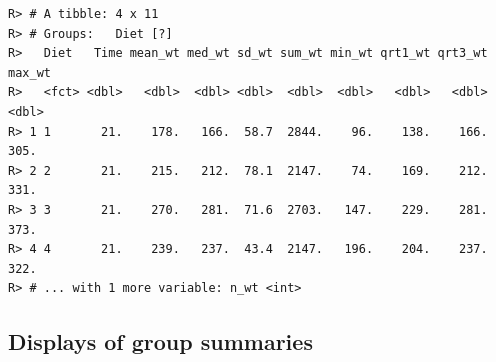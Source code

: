 \documentclass[english,10pt,a4paper,oneside]{book}
\newenvironment{Shaded}{\begin{snugshade}}{\end{snugshade}}
\newcommand{\KeywordTok}[1]{\textcolor[rgb]{0.13,0.29,0.53}{\textbf{#1}}}
\newcommand{\DataTypeTok}[1]{\textcolor[rgb]{0.13,0.29,0.53}{#1}}
\newcommand{\DecValTok}[1]{\textcolor[rgb]{0.00,0.00,0.81}{#1}}
\newcommand{\FloatTok}[1]{\textcolor[rgb]{0.00,0.00,0.81}{#1}}
\newcommand{\StringTok}[1]{\textcolor[rgb]{0.31,0.60,0.02}{#1}}
\newcommand{\OtherTok}[1]{\textcolor[rgb]{0.56,0.35,0.01}{#1}}
\newcommand{\OperatorTok}[1]{\textcolor[rgb]{0.81,0.36,0.00}{\textbf{#1}}}
\newcommand{\NormalTok}[1]{#1}
\theoremstyle{definition}
\theoremstyle{definition}
\theoremstyle{definition}
\theoremstyle{remark}
\begin{document}
\begin{Shaded}
\end{Shaded}

\begin{verbatim}
R> # A tibble: 4 x 11
R> # Groups:   Diet [?]
R>   Diet   Time mean_wt med_wt sd_wt sum_wt min_wt qrt1_wt qrt3_wt max_wt
R>   <fct> <dbl>   <dbl>  <dbl> <dbl>  <dbl>  <dbl>   <dbl>   <dbl>  <dbl>
R> 1 1       21.    178.   166.  58.7  2844.    96.    138.    166.   305.
R> 2 2       21.    215.   212.  78.1  2147.    74.    169.    212.   331.
R> 3 3       21.    270.   281.  71.6  2703.   147.    229.    281.   373.
R> 4 4       21.    239.   237.  43.4  2147.   196.    204.    237.   322.
R> # ... with 1 more variable: n_wt <int>
\end{verbatim}

\subsection{Displays of group
summaries}\label{displays-of-group-summaries}
\end{document}
